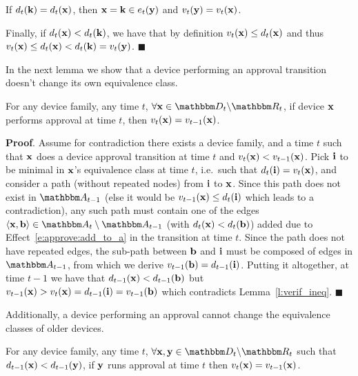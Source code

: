 If $d_{t}(\mathbf{k}) = d_{t}(\mathbf{x})$, then $\mathbf{x} = \mathbf{k} \in e_t(\mathbf{y})$ and
$v_{t}(\mathbf{y}) = v_{t}(\mathbf{x})$.

Finally, if $d_{t}(\mathbf{x}) < d_{t}(\mathbf{k})$, we have that by definition $v_{t}(\mathbf{x}) \leq
d_{t}(\mathbf{x})$ and thus $v_{t}(\mathbf{x}) \leq d_{t}(\mathbf{x}) < d_{t}(\mathbf{k}) =
v_{t}(\mathbf{y})$. $\blacksquare$

In the next lemma we show that a device performing an approval transition doesn't change its own
equivalence class.

\begin{lemma}
  For any device family, any time $t$, $\forall \zdev{x} \in \zactive{t}$, if device $\mathbf{x}$
  performs approval at time $t$, then $v_{t}(\mathbf{x}) = v_{t-1}(\mathbf{x})$.
  \label{l:nochange}
\end{lemma}
 
\textbf{Proof}. Assume for contradiction there exists a device family, and a time $t$ such that
$\mathbf{x}$ does a device approval transition at time $t$ and $v_{t}(\mathbf{x}) < v_{t-1}(\mathbf{x})$.
Pick $\mathbf{i}$ to be minimal in $\mathbf{x}$'s equivalence class at time $t$, i.e.\ such that
$d_{t}(\mathbf{i}) = v_{t}(\mathbf{x})$, and consider a path (without repeated nodes) from $\mathbf{i}$ to
$\mathbf{x}$. Since this path does not exist in $\zset{A}_{t-1}$ (else it would be $v_{t-1}(\mathbf{x})
\leq d_{t}(\mathbf{i})$ which leads to a contradiction), any such path must contain one of the edges
$\langle \zdev{x}, \zdev{b} \rangle \in \zset{A}_t \setminus \zset{A}_{t-1}$ (with $d_{t}(\mathbf{x})
< d_{t}(\mathbf{b})$) added due to Effect~\ref{e:approve:add_to_a} in the transition at time $t$.
Since the path does not have repeated edges, the sub-path between $\mathbf{b}$ and $\mathbf{i}$ must be
composed of edges in $\zset{A}_{t-1}$, from which we derive $v_{t-1}(\mathbf{b}) = d_{t-1}(\mathbf{i})$.
Putting it altogether, at time $t-1$ we have that $d_{t-1}(\mathbf{x})< d_{t-1}(\mathbf{b})$ but
$v_{t-1}(\mathbf{x}) >  v_{t}(\mathbf{x}) = d_{t-1}(\mathbf{i}) = v_{t-1}(\mathbf{b})$ which contradicts
Lemma~\ref{l:verif_ineq}. $\blacksquare$

Additionally, a device performing an approval cannot change the equivalence classes of older
devices.

\begin{lemma}
  For any device family, any time $t$, $\forall \zdev{x}, \zdev{y} \in \zactive{t}$ such that
  $d_{t-1}(\mathbf{x}) < d_{t-1}(\mathbf{y})$, if $\mathbf{y}$ runs approval at time $t$ then
  $v_{t}(\mathbf{x}) = v_{t-1}(\mathbf{x})$.
  \label{l:olders}
\end{lemma}

